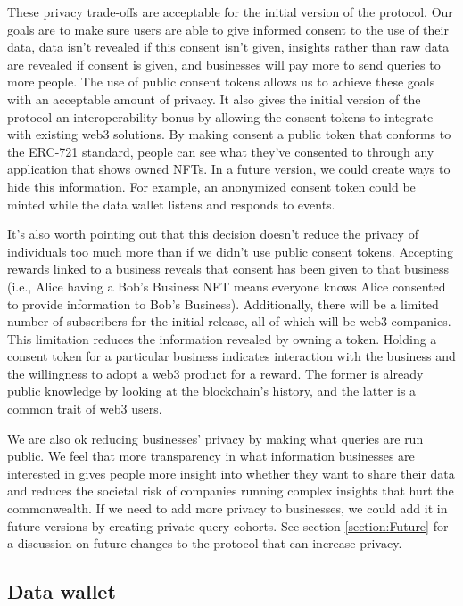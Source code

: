 These privacy trade-offs are acceptable for the initial version of the protocol. Our goals are to make sure users are able to give informed consent to the 
use of their data, data isn't revealed if this consent isn't given, insights rather than raw data are revealed if consent is given, and businesses will pay 
more to send queries to more people. The use of public consent tokens allows us to achieve these goals with an acceptable amount of privacy. It also gives 
the initial version of the protocol an interoperability bonus by allowing the consent tokens to integrate with existing web3 solutions. By making consent a 
public token that conforms to the ERC-721 standard, people can see what they've consented to through any application that shows owned NFTs. In a future 
version, we could create ways to hide this information. For example, an anonymized consent token could be minted while the data wallet listens and responds 
to events. %


It's also worth pointing out that this decision doesn't reduce the privacy of individuals too much more than if we didn't use public consent tokens. Accepting 
rewards linked to a business reveals that consent has been given to that business (i.e., Alice having a Bob's Business NFT means everyone knows Alice consented 
to provide information to Bob's Business). Additionally, there will be a limited number of subscribers for the initial release, all of which will be web3 
companies. This limitation reduces the information revealed by owning a token. Holding a consent token for a particular business indicates interaction with 
the business and the willingness to adopt a web3 product for a reward. The former is already public knowledge by looking at the blockchain's history, and the 
latter is a common trait of web3 users.


We are also ok reducing businesses' privacy by making what queries are run public. We feel that more transparency in what information businesses are interested 
in gives people more insight into whether they want to share their data and reduces the societal risk of companies running complex insights that hurt the 
commonwealth. If we need to add more privacy to businesses, we could add it in future versions by creating private query cohorts. See section \ref{section:Future} 
for a discussion on future changes to the protocol that can increase privacy.
\subsection{Data wallet}
\label{section:DataWallet}

